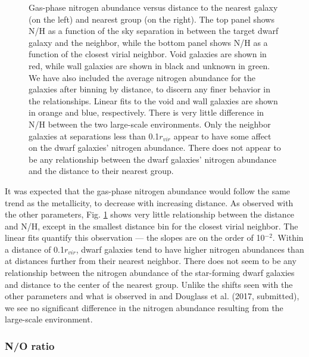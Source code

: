 \begin{figure}
    \caption[N/H versus distance to nearest neighbor and group]{Gas-phase 
    nitrogen abundance versus distance to the nearest galaxy (on the left) and 
    nearest group (on the right).  The top panel shows N/H as a function of the 
    sky separation in \hMpc between the target dwarf galaxy and the neighbor, 
    while the bottom panel shows N/H as a function of the closest virial 
    neighbor.  Void galaxies are shown in red, while wall galaxies are shown in 
    black and unknown in green.  We have also included the average nitrogen 
    abundance for the galaxies after binning by distance, to discern any finer 
    behavior in the relationships.  Linear fits to the void and wall galaxies 
    are shown in orange and blue, respectively.  There is very little difference 
    in N/H between the two large-scale environments.  Only the neighbor galaxies 
    at separations less than 0.1$r_{vir}$ appear to have some affect on the 
    dwarf galaxies' nitrogen abundance.  There does not appear to be any 
    relationship between the dwarf galaxies' nitrogen abundance and the distance 
    to their nearest group.}
    \label{fig:NH}
\end{figure}

It was expected that the gas-phase nitrogen abundance would follow the same 
trend as the metallicity, to decrease with increasing distance.  As observed 
with the other parameters, Fig. \ref{fig:NH} shows very little relationship 
between the distance and N/H, except in the smallest distance bin for the 
closest virial neighbor.  The linear fits quantify this observation --- the 
slopes are on the order of 10$^{-2}$.  Within a distance of 0.1$r_{vir}$, dwarf 
galaxies tend to have higher nitrogen abundances than at distances further from 
their nearest neighbor.  There does not seem to be any relationship between the 
nitrogen abundance of the star-forming dwarf galaxies and distance to the center 
of the nearest group.  Unlike the shifts seen with the other parameters and what 
is observed in \cite{Douglass17b} and Douglass et al. (2017, submitted), we see no 
significant difference in the nitrogen abundance resulting from the large-scale 
environment.


\subsubsection{N/O ratio}

